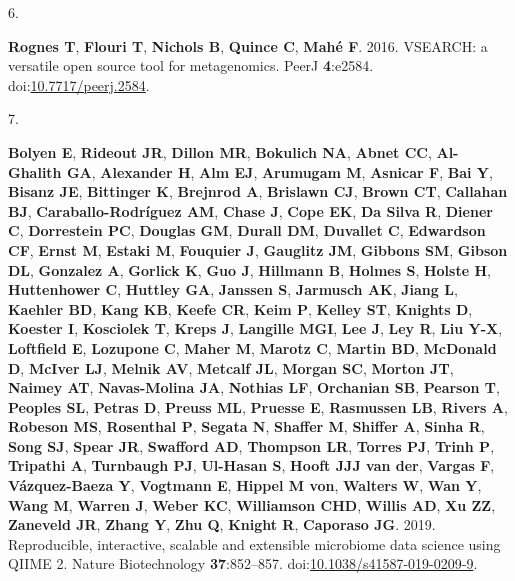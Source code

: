 \documentclass[
]{article}
\newlength{\cslhangindent}
\newlength{\csllabelwidth}
\newlength{\cslentryspacingunit} %
\newenvironment{CSLReferences}[2] %
 {%
  \setlength{\parindent}{0pt}
  \ifodd #1
  \let\oldpar\par
  \def\par{\hangindent=\cslhangindent\oldpar}
  \fi
  \setlength{\parskip}{#2\cslentryspacingunit}
 }%
 {}
\newcommand{\CSLLeftMargin}[1]{\parbox[t]{\csllabelwidth}{#1}}
\newcommand{\CSLRightInline}[1]{\parbox[t]{\linewidth - \csllabelwidth}{#1}\break}
\begin{document}
\begin{CSLReferences}{0}{1}
\leavevmode{}%
\CSLLeftMargin{6. }%
\CSLRightInline{\textbf{Rognes T}, \textbf{Flouri T}, \textbf{Nichols
B}, \textbf{Quince C}, \textbf{Mahé F}. 2016. VSEARCH: a versatile open
source tool for metagenomics. PeerJ \textbf{4}:e2584.
doi:\href{https://doi.org/10.7717/peerj.2584}{10.7717/peerj.2584}.}

\leavevmode{}%
\CSLLeftMargin{7. }%
\CSLRightInline{\textbf{Bolyen E}, \textbf{Rideout JR}, \textbf{Dillon
MR}, \textbf{Bokulich NA}, \textbf{Abnet CC}, \textbf{Al-Ghalith GA},
\textbf{Alexander H}, \textbf{Alm EJ}, \textbf{Arumugam M},
\textbf{Asnicar F}, \textbf{Bai Y}, \textbf{Bisanz JE},
\textbf{Bittinger K}, \textbf{Brejnrod A}, \textbf{Brislawn CJ},
\textbf{Brown CT}, \textbf{Callahan BJ}, \textbf{Caraballo-Rodríguez
AM}, \textbf{Chase J}, \textbf{Cope EK}, \textbf{Da Silva R},
\textbf{Diener C}, \textbf{Dorrestein PC}, \textbf{Douglas GM},
\textbf{Durall DM}, \textbf{Duvallet C}, \textbf{Edwardson CF},
\textbf{Ernst M}, \textbf{Estaki M}, \textbf{Fouquier J},
\textbf{Gauglitz JM}, \textbf{Gibbons SM}, \textbf{Gibson DL},
\textbf{Gonzalez A}, \textbf{Gorlick K}, \textbf{Guo J},
\textbf{Hillmann B}, \textbf{Holmes S}, \textbf{Holste H},
\textbf{Huttenhower C}, \textbf{Huttley GA}, \textbf{Janssen S},
\textbf{Jarmusch AK}, \textbf{Jiang L}, \textbf{Kaehler BD},
\textbf{Kang KB}, \textbf{Keefe CR}, \textbf{Keim P}, \textbf{Kelley
ST}, \textbf{Knights D}, \textbf{Koester I}, \textbf{Kosciolek T},
\textbf{Kreps J}, \textbf{Langille MGI}, \textbf{Lee J}, \textbf{Ley R},
\textbf{Liu Y-X}, \textbf{Loftfield E}, \textbf{Lozupone C},
\textbf{Maher M}, \textbf{Marotz C}, \textbf{Martin BD},
\textbf{McDonald D}, \textbf{McIver LJ}, \textbf{Melnik AV},
\textbf{Metcalf JL}, \textbf{Morgan SC}, \textbf{Morton JT},
\textbf{Naimey AT}, \textbf{Navas-Molina JA}, \textbf{Nothias LF},
\textbf{Orchanian SB}, \textbf{Pearson T}, \textbf{Peoples SL},
\textbf{Petras D}, \textbf{Preuss ML}, \textbf{Pruesse E},
\textbf{Rasmussen LB}, \textbf{Rivers A}, \textbf{Robeson MS},
\textbf{Rosenthal P}, \textbf{Segata N}, \textbf{Shaffer M},
\textbf{Shiffer A}, \textbf{Sinha R}, \textbf{Song SJ}, \textbf{Spear
JR}, \textbf{Swafford AD}, \textbf{Thompson LR}, \textbf{Torres PJ},
\textbf{Trinh P}, \textbf{Tripathi A}, \textbf{Turnbaugh PJ},
\textbf{Ul-Hasan S}, \textbf{Hooft JJJ van der}, \textbf{Vargas F},
\textbf{Vázquez-Baeza Y}, \textbf{Vogtmann E}, \textbf{Hippel M von},
\textbf{Walters W}, \textbf{Wan Y}, \textbf{Wang M}, \textbf{Warren J},
\textbf{Weber KC}, \textbf{Williamson CHD}, \textbf{Willis AD},
\textbf{Xu ZZ}, \textbf{Zaneveld JR}, \textbf{Zhang Y}, \textbf{Zhu Q},
\textbf{Knight R}, \textbf{Caporaso JG}. 2019. Reproducible,
interactive, scalable and extensible microbiome data science using QIIME
2. Nature Biotechnology \textbf{37}:852--857.
doi:\href{https://doi.org/10.1038/s41587-019-0209-9}{10.1038/s41587-019-0209-9}.}


\end{CSLReferences}
\end{document}
